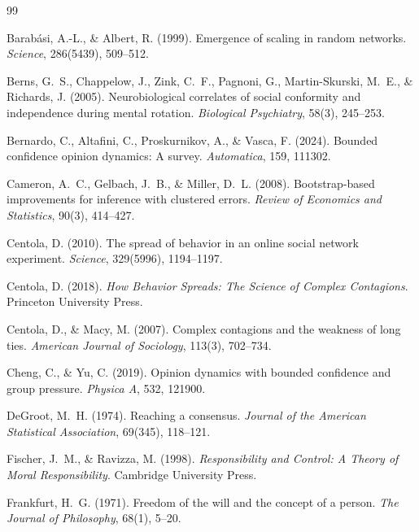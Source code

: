 \documentclass[11pt, a4paper]{article}
\begin{document}

\begin{thebibliography}{99}

Barab\'{a}si, A.-L., \& Albert, R. (1999).
Emergence of scaling in random networks.
\textit{Science}, 286(5439), 509--512.

Berns, G.~S., Chappelow, J., Zink, C.~F., Pagnoni, G., Martin-Skurski, M.~E., \& Richards, J. (2005).
Neurobiological correlates of social conformity and independence during mental rotation.
\textit{Biological Psychiatry}, 58(3), 245--253.

Bernardo, C., Altafini, C., Proskurnikov, A., \& Vasca, F. (2024).
Bounded confidence opinion dynamics: A survey.
\textit{Automatica}, 159, 111302.

Cameron, A.~C., Gelbach, J.~B., \& Miller, D.~L. (2008).
Bootstrap-based improvements for inference with clustered errors.
\textit{Review of Economics and Statistics}, 90(3), 414--427.

Centola, D. (2010).
The spread of behavior in an online social network experiment.
\textit{Science}, 329(5996), 1194--1197.

Centola, D. (2018).
\textit{How Behavior Spreads: The Science of Complex Contagions}.
Princeton University Press.

Centola, D., \& Macy, M. (2007).
Complex contagions and the weakness of long ties.
\textit{American Journal of Sociology}, 113(3), 702--734.

Cheng, C., \& Yu, C. (2019).
Opinion dynamics with bounded confidence and group pressure.
\textit{Physica A}, 532, 121900.

DeGroot, M.~H. (1974).
Reaching a consensus.
\textit{Journal of the American Statistical Association}, 69(345), 118--121.

Fischer, J.~M., \& Ravizza, M. (1998).
\textit{Responsibility and Control: A Theory of Moral Responsibility}.
Cambridge University Press.

Frankfurt, H.~G. (1971).
Freedom of the will and the concept of a person.
\textit{The Journal of Philosophy}, 68(1), 5--20.


\end{thebibliography}
\end{document}
